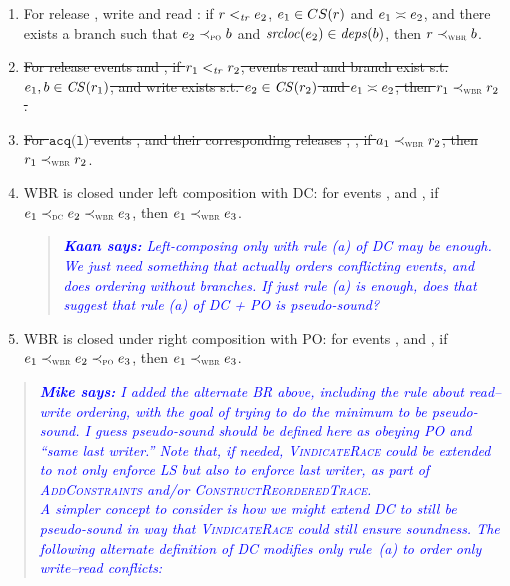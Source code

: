 \documentclass[letter,10pt]{article}
\newcommand{\Rule}[1]{rule~(#1)\xspace}
\newcommand{\CS}[1]{\ensuremath{\mathit{CS(}#1)}\xspace}
\newcommand{\conflicts}[2]{\ensuremath{#1 \asymp #2}} %
\newcommand{\getStatic}[1]{\ensuremath{\mathit{srcloc}(#1)}\xspace}
\newcommand{\getDeps}[1]{\ensuremath{\mathit{deps}(#1)}\xspace}
\newcommand{\LS}{LS\xspace}
\newcommand{\tr}{\ensuremath{\mathit{tr}}\xspace}
\newcommand{\PO}{PO\xspace}
\newcommand{\WDC}{DC\xspace}
\newcommand{\BR}{BR\xspace}
\newcommand{\WBR}{W\BR}
\newcommand{\DC}{\WDC}
\newcommand{\DCOrdered}[2]{\WDCOrdered{#1}{#2}}
\newcommand\checkRace{\textsc{VindicateRace}\xspace}
\newcommand{\ltTR}{\ensuremath{<_\textsc{\tr}}\xspace}
\newcommand{\ltPO}{\ensuremath{\prec_\textsc{\tiny{\PO}}}\xspace}
\newcommand{\ltWDC}{\ensuremath{\prec_\textsc{\tiny{\WDC}}}\xspace}
\newcommand{\ltWBR}{\ensuremath{\prec_\textsc{\tiny{\WBR}}}\xspace}
\newcommand{\Ordered}[3]{\ensuremath{#1 #2 #3}}
\newcommand{\TROrdered}[2]{\Ordered{#1}{\ltTR}{#2}}
\newcommand{\POOrdered}[2]{\Ordered{#1}{\ltPO}{#2}}
\newcommand{\WDCOrdered}[2]{\Ordered{#1}{\ltWDC}{#2}}
\newcommand{\WBROrdered}[2]{\Ordered{#1}{\ltWBR}{#2}}
\newcommand{\code}[1]{\texttt{#1}}
\newcommand{\Acquire}[1]{\ensuremath{\code{acq(#1)}}}
\newcommand\BrDepsOn[2]{\ensuremath{\getStatic{#2} \in \getDeps{#1}}}
\newcommand{\originalgrumbler}[2]{\begin{quote}\textcolor{blue}{\sl{\bf #1 says:} #2}\end{quote}}
\newcommand{\grumbler}[2]{\originalgrumbler{#1}{#2}}
\newcommand{\mike}[1]{\grumbler{Mike}{#1}}
\newcommand{\kaan}[1]{\grumbler{Kaan}{#1}}
\begin{document}
\begin{enumerate}[label=(\alph*)]
\item For release , write  and read : if
  \TROrdered{\event{r}{}}{\event{e}{_2}}, $\event{e}{_1} \in CS(r)$
  and \conflicts{\event{e}{_1}}{\event{e}{_2}}, and there exists a
  branch  such that \POOrdered{\event{e}{_2}}{\event{b}{}} and
  \BrDepsOn{\event{b}{}}{\event{e}{_2}}, then \WBROrdered{\event{r}{}}{\event{b}{}}.\label{rel:wbr:wr-rd}
\item \sout{For release events  and , if
  \TROrdered{\event{r}{_1}}{\event{r}{_2}}, events read  and branch
   exist s.t. $\event{e}{_1},\event{b}{}\in\CS{\event{r}{_1}}$, and
  write  exists s.t. $\event{e}{_2} \in \CS{\event{r}{_2}}$ and
  \conflicts{\event{e}{_1}}{\event{e}{_2}}, then \WBROrdered{\event{r}{_1}}{\event{r}{_2}}.}
\item \sout{For \Acquire{l} events ,  and their corresponding
  releases , , if \WBROrdered{\event{a}{_1}}{\event{r}{_2}},
  then \WBROrdered{\event{r}{_1}}{\event{r}{_2}}}.
\item \WBR is closed under left composition with \DC: for
  events ,  and , if
  \DCOrdered{\event{e}{_1}}{\WBROrdered{\event{e}{_2}}{\event{e}{_3}}},
  then \WBROrdered{\event{e}{_1}}{\event{e}{_3}}. \label{rel:wbr:dc-left}
  \kaan{Left-composing only with rule (a) of DC may be enough. We just need
    something that actually orders conflicting events, and does ordering without
    branches. If just rule (a) is enough, does that suggest that rule (a) of DC
    + PO is pseudo-sound?}
\item \WBR is closed under right composition with \PO: for
  events ,  and , if
  \WBROrdered{\event{e}{_1}}{\POOrdered{\event{e}{_2}}{\event{e}{_3}}},
  then \WBROrdered{\event{e}{_1}}{\event{e}{_3}}.\label{rel:wbr:po-right}
\end{enumerate}

\mike{I added the alternate \BR above, including the rule about read--write ordering,
with the goal of trying to do the minimum to be pseudo-sound.
I guess pseudo-sound should be defined here as obeying \PO and ``same last writer.''
Note that, if needed, \checkRace could be extended to not only enforce \LS but also to enforce
last writer, as part of \textsc{AddConstraints} and/or \textsc{ConstructReorderedTrace}.
\medskip\\
A simpler concept to consider is how we might extend \DC to still be pseudo-sound in way that \checkRace could still ensure soundness.
The following alternate definition of \DC modifies only \Rule{a} to order only write--read conflicts:}
\end{document}

